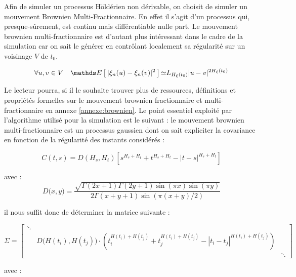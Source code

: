 Afin de simuler un processus Höldérien non dérivable, on choisit de simuler un mouvement Brownien Multi-Fractionnaire. En effet il s'agit d'un processus qui, presque-sûrement, est continu mais différentiable nulle part. Le mouvement brownien multi-fractionnaire est d'autant plus intéressant dans le cadre de la simulation car on sait le générer en contrôlant localement sa régularité sur un voisinage $V$ de $t_0$.

\begin{equation*}
	\forall u,v \in V \quad	\esperance{ | \xi_n(u) - \xi_n(v) |^2 } \mathbf{\simeq} L_{H_{\xi}(t_0) } |u - v|^{2 H_{\xi}(t_0)}
\end{equation*}

Le lecteur pourra, si il le souhaite trouver plus de ressources, définitions et propriétés formelles sur le mouvement brownien fractionnaire et multi-fractionnaire en annexe \ref{annexe:brownien}. Le point essentiel exploité par l'algorithme utilisé pour la simulation est le suivant : le mouvement brownien multi-fractionnaire est un processus gaussien dont on sait expliciter la covariance en fonction de la régularité des instants considérés :

$$
	C(t,s) = D(H_{s},H_{t})\left[s^{H_{s}+H_{t}}+t^{H_{s}+H_{t}}-|t-s|^{H_{s}+H_{t}}\right]
$$

avec :
$$
	D\bigl(x,y\bigr) = \frac{{\sqrt{\Gamma(2x+1)\Gamma(2y+1)\sin(\pi x)\sin(\pi y)}}}{2\Gamma(x+y+1)\sin(\pi(x+y)/2)}
$$

il nous suffit donc de déterminer la matrice suivante :

$$
	\Sigma = \begin{bmatrix}
		\ddots &                                                                                                                  &
		\\
		       & D\bigl(H(t_i), H(t_j) \bigr)\cdot( t_i^{H(t_i) + H(t_j)} + t_j^{H(t_i) + H(t_j)} - |t_i-t_j|^{H(t_i) + H(t_j)} ) &
		\\
		       &                                                                                                                  & \ddots
	\end{bmatrix}
$$

avec :


